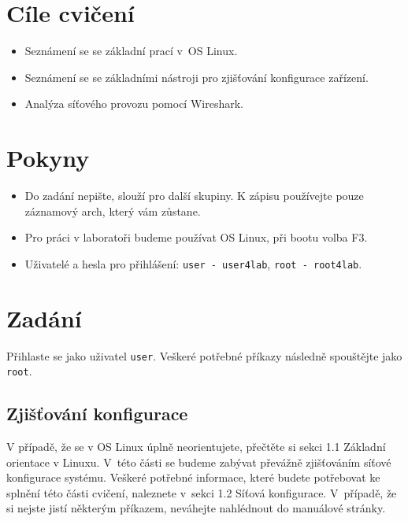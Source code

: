 \section*{Cíle cvičení}
\begin{itemize}
	\item Seznámení se se základní prací v~OS Linux.
	\item Seznámení se se základními nástroji pro zjišťování konfigurace zařízení.
	\item Analýza síťového provozu pomocí Wireshark.
\end{itemize}

\section*{Pokyny}
\begin{itemize}
\item Do zadání nepište, slouží pro další skupiny. K zápisu používejte pouze záznamový arch, který vám zůstane.
\item Pro práci v laboratoři budeme používat OS Linux, při bootu volba F3.
\item Uživatelé a hesla pro přihlášení: \texttt{user - user4lab}, \texttt{root - root4lab}.
\end{itemize}

\section{Zadání}
Přihlaste se jako uživatel \texttt{user}. Veškeré potřebné příkazy následně spouštějte jako \texttt{root}.

\subsection{Zjišťování konfigurace}
V případě, že se v OS Linux úplně neorientujete, přečtěte si sekci 1.1 Základní orientace v Linuxu. V~této části se budeme zabývat převážně zjišťováním síťové konfigurace systému. Veškeré potřebné informace, které budete potřebovat ke splnění této části cvičení, naleznete v~sekci 1.2 Síťová konfigurace. V~případě, že si nejste jistí některým příkazem, neváhejte nahlédnout do manuálové stránky.

